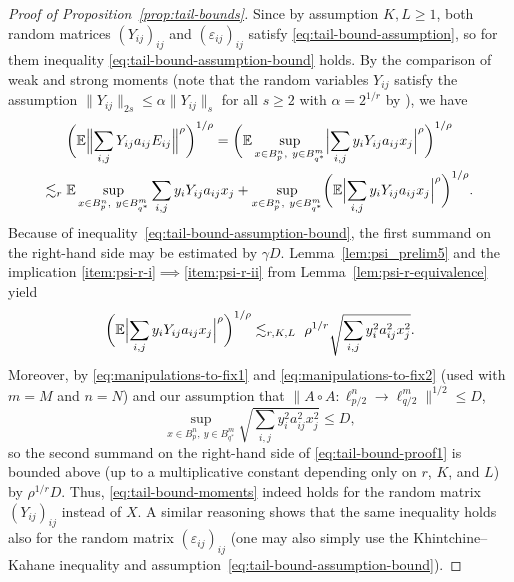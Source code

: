 \documentclass[a4paper]{amsart}
\theoremstyle{definition}
\theoremstyle{remark}
\numberwithin{equation}{section}
\newcommand*{\EE}{\mathbb{E}}
\newcommand*{\hadprod}{\mathbin{\circ}} %
\begin{document}
\begin{proof}[Proof of Proposition~\ref{prop:tail-bounds}]
	Since by assumption $K,L\ge 1$, both random matrices $(Y_{ij})_{ij}$ and $(\varepsilon_{ij})_{ij}$ satisfy \eqref{eq:tail-bound-assumption}, so for them inequality \eqref{eq:tail-bound-assumption-bound} holds.
	By the comparison of weak and strong moments \cite[Theorem~1.1]{LatalaStrzeleckaMat} (note that the random variables $Y_{ij}$ satisfy the assumption $\|Y_{ij}\|_{2s}\le\alpha \|Y_{ij}\|_s$ for all $s\ge 2$ with $\alpha =2^{1/r}$ by \cite[Remark~1.5]{LatalaStrzeleckaMat}), we have
	\begin{multline} \label{eq:tail-bound-proof1}
		 \biggl( \EE \Bigl\|\sum_{i,j} Y_{ij} a_{ij}E_{ij} \Bigr\|^\rho \biggr)^{1/\rho}
		 = \biggl( \EE\sup_{x\in B_p^n,\ y\in B_{q^*}^m} \Bigl|\sum_{i,j} y_iY_{ij} a_{ij}x_{j} \Bigr|^\rho \biggr)^{1/\rho}
		\\
		\lesssim _r   \EE\sup_{x\in B_p^n,\ y\in B_{q^*}^m} \sum_{i,j} y_iY_{ij} a_{ij}x_{j} +  \sup_{x\in B_p^n,\ y\in B_{q^*}^m} \biggl(\EE \Bigl| \sum_{i,j} y_iY_{ij} a_{ij}x_{j} \Bigr|^{\rho} \biggr)^{1/\rho}.
	\end{multline}
	 Because of inequality~\eqref{eq:tail-bound-assumption-bound}, the first summand on the right-hand side may be estimated by $\gamma D$. Lemma~\ref{lem:psi_prelim5} and the implication \ref{item:psi-r-i}$\implies$\ref{item:psi-r-ii} from Lemma~\ref{lem:psi-r-equivalence} yield
	 \begin{equation*}	
	 	 	\biggl(\EE \Bigl| \sum_{i,j} y_iY_{ij} a_{ij}x_{j} \Bigr|^{\rho} \biggr)^{1/\rho} \lesssim_{r,K,L} \ \rho^{1/r} \sqrt{ \sum_{i,j} y_i^2a_{ij}^2x_{j}^2}.
	 \end{equation*}
	 Moreover, by \eqref{eq:manipulations-to-fix1} and \eqref{eq:manipulations-to-fix2} (used with $m=M$ and $n=N$)
	 and our assumption that $\|A\hadprod A \colon \ell^n_{p/2} \to \ell^m_{q/2}\|^{1/2} \leq D$,
	 	 \[
	 	 \sup_{x\in B_p^n,\ y\in B_{q^*}^m} \sqrt{ \sum_{i,j} y_i^2a_{ij}^2x_{j}^2} \leq D,
	 \]
	 so the second summand on the right-hand side of \eqref{eq:tail-bound-proof1} is bounded above (up to a multiplicative constant depending only on $r$, $K$, and $L$) by $\rho^{1/r}D$.
	 Thus, \eqref{eq:tail-bound-moments} indeed holds for the random matrix $(Y_{ij})_{ij}$ instead of $X$.
	A similar reasoning shows that the same inequality holds also for the random matrix $( \varepsilon_{ij})_{ij}$ (one may also simply use the Khintchine--Kahane inequality and assumption~\eqref{eq:tail-bound-assumption-bound}).
	\end{proof}
\end{document}
